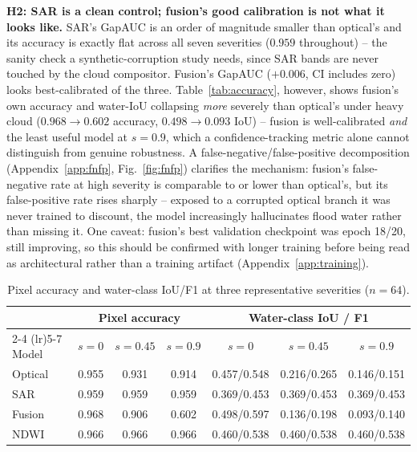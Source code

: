 \documentclass{article}
\begin{document}
\textbf{H2: SAR is a clean control; fusion's good calibration is not what it looks like.} SAR's GapAUC is an order of magnitude smaller than optical's and its accuracy is exactly flat across all seven severities ($0.959$ throughout) -- the sanity check a synthetic-corruption study needs, since SAR bands are never touched by the cloud compositor. Fusion's GapAUC ($+0.006$, CI includes zero) looks best-calibrated of the three. Table~\ref{tab:accuracy}, however, shows fusion's own accuracy and water-IoU collapsing \emph{more} severely than optical's under heavy cloud ($0.968\to0.602$ accuracy, $0.498\to0.093$ IoU) -- fusion is well-calibrated \emph{and} the least useful model at $s=0.9$, which a confidence-tracking metric alone cannot distinguish from genuine robustness. A false-negative/false-positive decomposition (Appendix~\ref{app:fnfp}, Fig.~\ref{fig:fnfp}) clarifies the mechanism: fusion's false-negative rate at high severity is comparable to or lower than optical's, but its false-positive rate rises sharply -- exposed to a corrupted optical branch it was never trained to discount, the model increasingly hallucinates flood water rather than missing it. One caveat: fusion's best validation checkpoint was epoch 18/20, still improving, so this should be confirmed with longer training before being read as architectural rather than a training artifact (Appendix~\ref{app:training}).

\begin{table}[t]
\centering
\caption{Pixel accuracy and water-class IoU/F1 at three representative severities ($n{=}64$).}
\label{tab:accuracy}
\label{tab:iou}
\footnotesize
\renewcommand{\arraystretch}{0.92}
\begin{tabular}{lccc@{\hspace{1.2em}}ccc}
\toprule
& \multicolumn{3}{c}{Pixel accuracy} & \multicolumn{3}{c}{Water-class IoU / F1} \\
\cmidrule(lr){2-4} \cmidrule(lr){5-7}
Model & $s{=}0$ & $s{=}0.45$ & $s{=}0.9$ & $s{=}0$ & $s{=}0.45$ & $s{=}0.9$ \\
\midrule
Optical & 0.955 & 0.931 & 0.914 & 0.457/0.548 & 0.216/0.265 & 0.146/0.151 \\
SAR & 0.959 & 0.959 & 0.959 & 0.369/0.453 & 0.369/0.453 & 0.369/0.453 \\
Fusion & 0.968 & 0.906 & 0.602 & 0.498/0.597 & 0.136/0.198 & 0.093/0.140 \\
NDWI & 0.966 & 0.966 & 0.966 & 0.460/0.538 & 0.460/0.538 & 0.460/0.538 \\
\bottomrule
\end{tabular}
\end{table}
\end{document}
